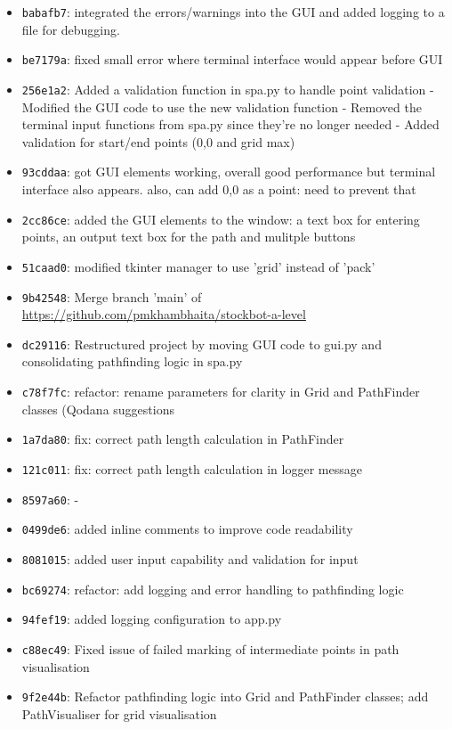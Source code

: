 \begin{itemize}
	\item \texttt{babafb7}: integrated the errors/warnings into the GUI and added logging to a file for debugging.
	\item \texttt{be7179a}: fixed small error where terminal interface would appear before GUI
	\item \texttt{256e1a2}: Added a validation function in spa.py to handle point validation - Modified the GUI code to use the new validation function - Removed the terminal input functions from spa.py since they're no longer needed - Added validation for start/end points (0,0 and grid max)
	\item \texttt{93cddaa}: got GUI elements working, overall good performance but terminal interface also appears. also, can add 0,0 as a point: need to prevent that
	\item \texttt{2cc86ce}: added the GUI elements to the window: a text box for entering points, an output text box for the path and mulitple buttons
	\item \texttt{51caad0}: modified tkinter manager to use 'grid' instead of 'pack'
	\item \texttt{9b42548}: Merge branch 'main' of \url{https://github.com/pmkhambhaita/stockbot-a-level}
	\item \texttt{dc29116}: Restructured project by moving GUI code to gui.py and consolidating pathfinding logic in spa.py
	\item \texttt{c78f7fc}: refactor: rename parameters for clarity in Grid and PathFinder classes (Qodana suggestions
	\item \texttt{1a7da80}: fix: correct path length calculation in PathFinder
	\item \texttt{121c011}: fix: correct path length calculation in logger message
	\item \texttt{8597a60}: -
	\item \texttt{0499de6}: added inline comments to improve code readability
	\item \texttt{8081015}: added user input capability and validation for input
	\item \texttt{bc69274}: refactor: add logging and error handling to pathfinding logic
	\item \texttt{94fef19}: added logging configuration to app.py
	\item \texttt{c88ec49}: Fixed issue of failed marking of intermediate points in path visualisation
	\item \texttt{9f2e44b}: Refactor pathfinding logic into Grid and PathFinder classes; add PathVisualiser for grid visualisation

\end{itemize}
